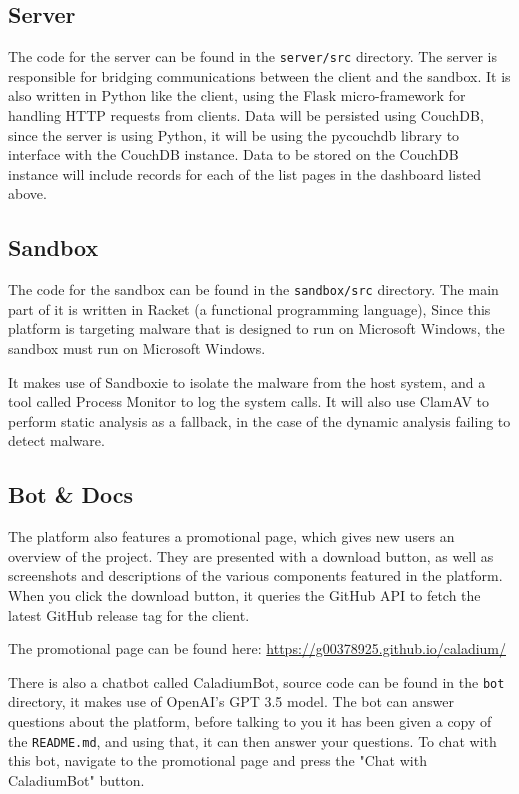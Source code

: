 \subsection{Server}
The code for the server can be found in the \texttt{server/src} directory.
The server is responsible for bridging communications between the client and the sandbox.
It is also written in Python like the client,
using the Flask micro-framework for handling HTTP requests from clients.
Data will be persisted using CouchDB, since the server is using Python,
it will be using the pycouchdb library to interface with the CouchDB instance.
Data to be stored on the CouchDB instance will include records for
each of the list pages in the dashboard listed above.

\subsection{Sandbox}
The code for the sandbox can be found in the \texttt{sandbox/src} directory.
The main part of it is written in Racket (a functional programming language),
Since this platform is targeting malware that is designed to
run on Microsoft Windows, the sandbox must run on Microsoft Windows.

It makes use of Sandboxie to isolate the malware from the host system,
and a tool called Process Monitor to log the system calls.
It will also use ClamAV to perform static analysis as a fallback,
in the case of the dynamic analysis failing to detect malware.

\subsection{Bot \& Docs}
The platform also features a promotional page,
which gives new users an overview of the project.
They are presented with a download button,
as well as screenshots and descriptions of
the various components featured in the platform.
When you click the download button,
it queries the GitHub API to fetch the latest
GitHub release tag for the client.

The promotional page can be found here:
\href{https://g00378925.github.io/caladium/}{https://g00378925.github.io/caladium/}

There is also a chatbot called CaladiumBot, source code can be found in the
\texttt{bot} directory, it makes use of OpenAI's GPT 3.5 model. \cite{openai}
The bot can answer questions about the platform,
before talking to you it has been given a copy of the \texttt{README.md},
and using that, it can then answer your questions.
To chat with this bot, navigate to the promotional page and press the
"Chat with CaladiumBot" button.

